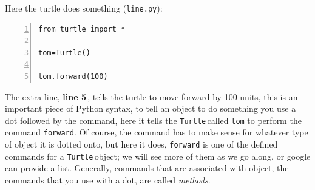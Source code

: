 \documentclass[11pt,a4paper]{scrartcl}
\newcommand{\turtle}{\texttt{Turtle}\,}
\newcommand{\lnn}[1]{\textbf{line #1}\,}
\begin{document}
Here the turtle does something (\texttt{line.py}):
\begin{lstlisting}[numbers=left]
from turtle import *

tom=Turtle()

tom.forward(100)
\end{lstlisting}
The extra line, \lnn{5}, tells the turtle to move forward by 100
units, this is an important piece of Python syntax, to tell an object
to do something you use a dot followed by the command, here it tells
the \turtle called \texttt{tom} to perform the command
\texttt{forward}. Of course, the command has to make sense for
whatever type of object it is dotted onto, but here it does,
\texttt{forward} is one of the defined commands for a \turtle object;
we will see more of them as we go along, or google can provide a
list. Generally, commands that are associated with object, the
commands that you use with a dot, are called \textsl{methods}.
\begin{center}
\end{center}
\end{document}
